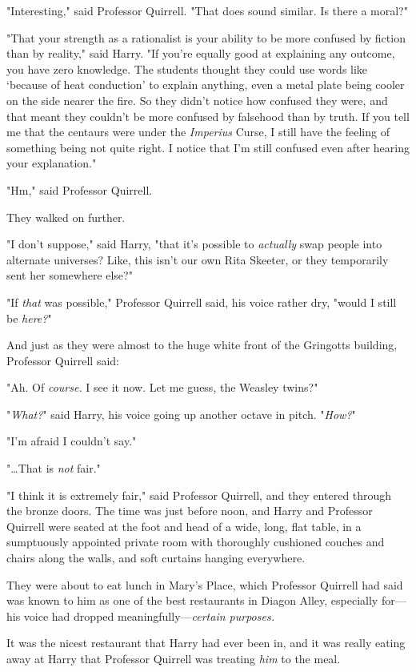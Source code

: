 "Interesting," said Professor Quirrell. "That does sound similar. Is there a
moral?"

"That your strength as a rationalist is your ability to be more confused by
fiction than by reality," said Harry. "If you're equally good at explaining any
outcome, you have zero knowledge. The students thought they could use words
like `because of heat conduction' to explain anything, even a metal plate being
cooler on the side nearer the fire. So they didn't notice how confused they
were, and that meant they couldn't be more confused by falsehood than by truth.
If you tell me that the centaurs were under the \emph{Imperius} Curse, I still
have the feeling of something being not quite right. I notice that I'm still
confused even after hearing your explanation."

"Hm," said Professor Quirrell.

They walked on further.

"I don't suppose," said Harry, "that it's possible to \emph{actually} swap
people into alternate universes? Like, this isn't our own Rita Skeeter, or they
temporarily sent her somewhere else?"

"If \emph{that} was possible," Professor Quirrell said, his voice rather dry,
"would I still be \emph{here?}"

And just as they were almost to the huge white front of the Gringotts building,
Professor Quirrell said:

"Ah. Of \emph{course.} I see it now. Let me guess, the Weasley twins?"

"\emph{What?}" said Harry, his voice going up another octave in pitch.
"\emph{How?}"

"I'm afraid I couldn't say."

"{\ldots}That is \emph{not} fair."

"I think it is extremely fair," said Professor Quirrell, and they entered
through the bronze doors.
\sbreak
The time was just before noon, and Harry and Professor Quirrell were seated at
the foot and head of a wide, long, flat table, in a sumptuously appointed
private room with thoroughly cushioned couches and chairs along the walls, and
soft curtains hanging everywhere.

They were about to eat lunch in Mary's Place, which Professor Quirrell had said
was known to him as one of the best restaurants in Diagon Alley, especially
for---his voice had dropped meaningfully---\emph{certain purposes.}

It was the nicest restaurant that Harry had ever been in, and it was really
eating away at Harry that Professor Quirrell was treating \emph{him} to the
meal.

